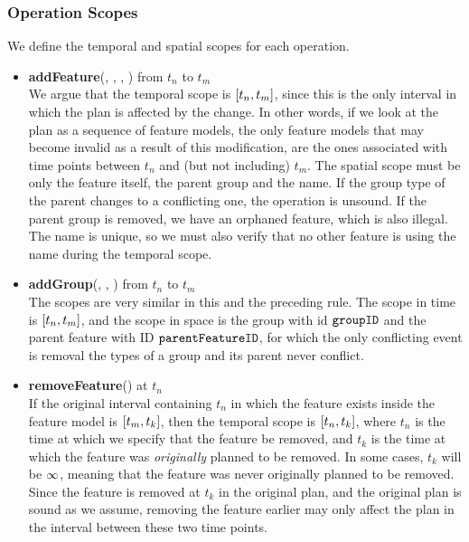 \subsubsection*{Operation Scopes}
We define the temporal and spatial scopes for each operation.
\begin{itemize}

  \item \textbf{addFeature}(, , , ) from $t_n$ to $t_m$\\
     We argue that the temporal scope is $\interval{t_n}{t_m}$, since this is the only interval in which the plan is affected by the change. In other words, if we look at the plan as a sequence of feature models, the only feature models that may become invalid as a result of this modification, are the ones associated with time points between $t_n$ and (but not including) $t_m$. The spatial scope must be only the feature itself, the parent group and the name. If the group type of the parent changes to a conflicting one, the operation is unsound. If the parent group is removed, we have an orphaned feature, which is also illegal. The name is unique, so we must also verify that no other feature is using the name during the temporal scope. 
 

  \item \textbf{addGroup}(, , ) from $t_n$ to $t_m$\\
    The scopes are very similar in this and the preceding rule. The scope in time is $\interval{t_n}{t_m}$, and the scope in space is the group with id $\texttt{groupID}$ and the parent feature with ID $\texttt{parentFeatureID}$, for which the only conflicting event is removal \textemdash{} the types of a group and its parent never conflict. 
  \item \textbf{removeFeature}() at $t_n$\\
    If the original interval containing $t_n$ in which the feature exists inside the feature model is $\interval{t_m}{t_k}$, then the temporal scope is $\interval{t_n}{t_k}$, where $t_n$ is the time at which we specify that the feature be removed, and $t_k$ is the time at which the feature was \emph{originally} planned to be removed. In some cases, $t_k$ will be $\infty$, meaning that the feature was never originally planned to be removed. Since the feature is removed at $t_k$ in the original plan, and the original plan is sound as we assume, removing the feature earlier may only affect the plan in the interval between these two time points.


\end{itemize}
